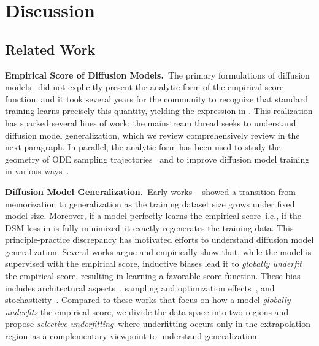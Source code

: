 \section{Discussion} \label{app:discussion}

\subsection{Related Work} \label{app:related-work}

\textbf{Empirical Score of Diffusion Models.}~The primary formulations of diffusion models~\citep{ho2020denoising,song2020score,sohl2015deep} did not explicitly present the analytic form of the empirical score function, and it took several years for the community to recognize that standard training learns precisely this quantity, yielding the expression in . This realization has sparked several lines of work: the mainstream thread seeks to understand diffusion model generalization, which we review comprehensively review in the next paragraph. In parallel, the analytic form has been used to study the geometry of ODE sampling trajectories~\citep{chen2025geometric,wan2024elucidating} and to improve diffusion model training in various ways~\citep{niedoba2024nearest,xu2023stable,scarvelis2023closed,xu2025diagnosing}.

\textbf{Diffusion Model Generalization.}~Early works ~\citep{gu2023memorization,yoon2023diffusion} showed a transition from memorization to generalization as the training dataset size grows under fixed model size. Moreover, if a model perfectly learns the empirical score--i.e., if the DSM loss in  is fully minimized--it exactly regenerates the training data. This principle-practice discrepancy 
has motivated efforts to understand diffusion model generalization. Several works argue and empirically show that, while the model is supervised with the empirical score, inductive biases lead it to \emph{globally underfit} the empirical score, resulting in learning a favorable score function. These bias includes architectural aspects~\citep{kamb2024analytic,kadkhodaie2023generalization,niedoba2024towards}, sampling and optimization effects~\citep{yi2023generalization,wu2025taking}, and stochasticity~\citep{vastola2025generalization}. Compared to these works that focus on how a model \emph{globally underfits} the empirical score, we divide the data space into two regions and propose \emph{selective underfitting}--where underfitting occurs only in the extrapolation region--as a complementary viewpoint to understand generalization.

